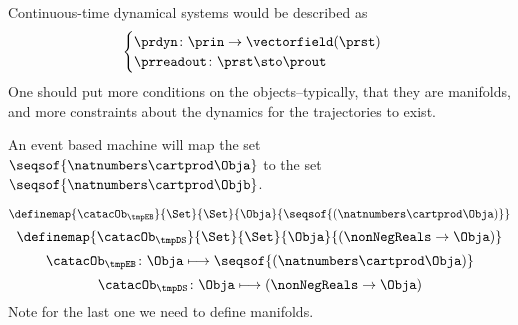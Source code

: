 Continuous-time dynamical systems would be described as
%
\begin{equation}
    \label{eq:continuous}
    \begin{cases}
        \prdyn\colon \prin \to \vectorfield(\prst) \\
        \prreadout\colon \prst \sto   \prout
    \end{cases}
\end{equation}
%
One should put more conditions on the objects--typically, that they are manifolds, and more constraints about the dynamics for the trajectories to exist.



An event based machine will map the set~$\seqsof{\natnumbers \cartprod \Obja}$ to the set~$\seqsof{\natnumbers \cartprod \Objb}$.


\begin{equation}
    \definemap{\catacOb_{\tmpEB}}{\Set}{\Set}{\Obja}{\seqsof{(\natnumbers \cartprod \Obja)}}
\end{equation}
\begin{equation}
    \definemap{\catacOb_{\tmpDS}}{\Set}{\Set}{\Obja}{(\nonNegReals \to \Obja)}
\end{equation}
\begin{equation}
    \label{eq:phi-EB}
    {\catacOb_{\tmpEB}}\colon{\Obja}\longmapsto{\seqsof{(\natnumbers \cartprod \Obja)}}
\end{equation}
\begin{equation}
    \label{eq:phi-DS}
    {\catacOb_{\tmpDS}}\colon{\Obja}\longmapsto{(\nonNegReals \to \Obja)}
\end{equation}
Note for the last one we need to define manifolds.
